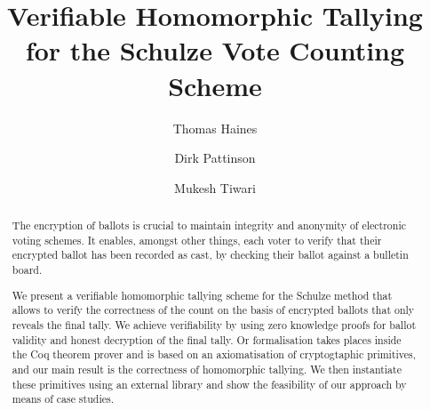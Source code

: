 \documentclass{llncs}
\begin{document}
\title{Verifiable Homomorphic Tallying for the Schulze Vote Counting
Scheme}

\author{Thomas Haines  \and
      Dirk Pattinson \and Mukesh Tiwari }
\maketitle

\begin{abstract}
The encryption of ballots is crucial to maintain integrity and 
anonymity of electronic voting schemes. It enables, amongst other 
things, each voter to verify that their encrypted ballot has been 
recorded as cast, by checking their ballot against a bulletin board. 

We present a verifiable homomorphic tallying scheme for the Schulze 
method that allows to verify the correctness of the count on the 
basis of encrypted ballots that only reveals the final tally. We 
achieve verifiability by using zero knowledge proofs for ballot 
validity and honest decryption of the final tally. Or formalisation 
takes places inside the Coq theorem prover and is based on an 
axiomatisation of cryptogtaphic primitives, and our main result is 
the correctness of homomorphic tallying. We then instantiate 
these primitives using an external library and show the feasibility 
of our approach by means of case studies.
\end{abstract}
\end{document}
